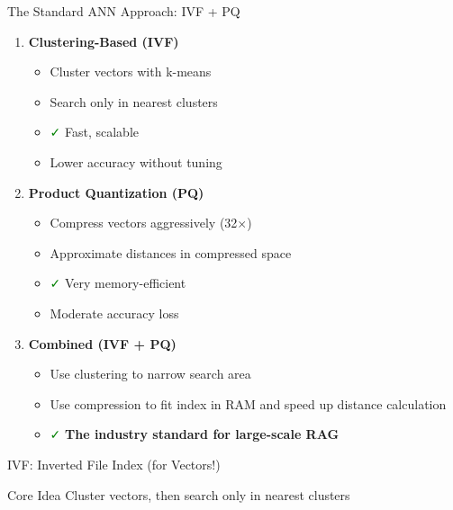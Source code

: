 \documentclass[aspectratio=169]{beamer}
\newif\ifanimated
\newcommand{\cpause}{\ifanimated\pause\fi}
\begin{document}
\begin{frame}[shrink=5]{The Standard ANN Approach: IVF + PQ}
\begin{enumerate}
    \item \textbf{Clustering-Based (IVF)}
    \begin{itemize}
        \item Cluster vectors with k-means
        \item Search only in nearest clusters
        \item \textcolor{green}{\faCheck } Fast, scalable
        \item \textcolor{red}{\faTimes } Lower accuracy without tuning
    \end{itemize}
    
    \item \textbf{Product Quantization (PQ)}
    \begin{itemize}
        \item Compress vectors aggressively (32$\times$)
        \item Approximate distances in compressed space
        \item \textcolor{green}{\faCheck } Very memory-efficient
        \item \textcolor{red}{\faTimes } Moderate accuracy loss
    \end{itemize}
    
    \item \textbf{Combined (IVF + PQ)}
    \begin{itemize}
        \item Use clustering to narrow search area
        \item Use compression to fit index in RAM and speed up distance calculation
        \item \textcolor{green}{\faCheck } \textbf{The industry standard for large-scale RAG}
    \end{itemize}
\end{enumerate}
\end{frame}


\begin{frame}[shrink=10]{IVF: Inverted File Index (for Vectors!)}
\begin{block}{Core Idea}
Cluster vectors, then search only in nearest clusters
\end{block}
\cpause

\vspace{0.5em}

\begin{center}

\end{center}
\end{frame}
\end{document}
